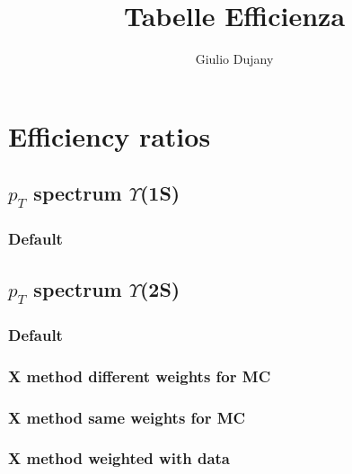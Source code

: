 \documentclass[a4paper,12pt]{article}
\title{Tabelle Efficienza}
\author{Giulio Dujany}
\date{}
\begin{document}
 \section*{Efficiency ratios}

\subsection*{$p_T$ spectrum $\Upsilon$(1S)}
\subsubsection{Default}

% 
% 
% 

\subsection*{$p_T$ spectrum $\Upsilon$(2S)}
\subsubsection{Default}

\subsubsection{X method different weights for MC}

\subsubsection{X method same weights for MC}

\subsubsection{X method weighted with data}

\end{document}
